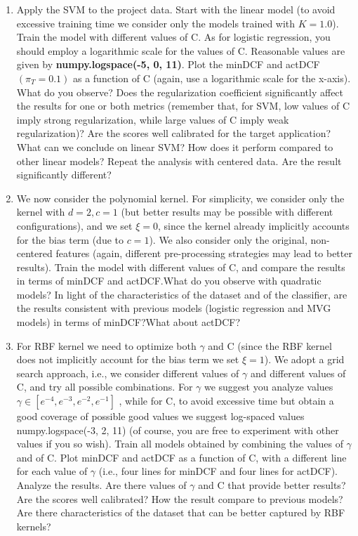 \documentclass[a4paper, 12pt, english]{article}
\begin{document}
    \begin{enumerate}
        \item Apply the SVM to the project data. Start with the linear model (to avoid excessive training time we consider only the models trained with \(K = 1.0\)). Train the model with different values of C. As for logistic regression, you should employ a logarithmic scale for the values of C. Reasonable values are given by \textbf{numpy.logspace(-5, 0, 11)}. Plot the minDCF and actDCF \((\pi_T = 0.1)\) as a function of C (again, use a logarithmic scale for the x-axis). What do you observe? Does the regularization coefficient significantly affect the results for one or both metrics (remember that, for SVM, low values of C imply strong regularization, while large values of C imply weak regularization)? Are the scores well calibrated for the target application? What can we conclude on linear SVM? How does it perform compared to other linear models? Repeat the analysis with centered data. Are the result significantly different?
        \item We now consider the polynomial kernel. For simplicity, we consider only the kernel with \(d = 2,c = 1\) (but better results may be possible with different configurations), and we set \(\xi = 0\), since the kernel already implicitly accounts for the bias term (due to \(c = 1\)). We also consider only the original, non-centered features (again, different pre-processing strategies may lead to better results). Train the model with different values of C, and compare the results in terms of minDCF and actDCF.\@ What do you observe with quadratic models? In light of the characteristics of the dataset and of the classifier, are the results consistent with previous models (logistic regression and MVG models) in terms of minDCF?\@ What about actDCF?\@
        \item For RBF kernel we need to optimize both \(\gamma\) and C (since the RBF kernel does not implicitly account for the bias term we set \(\xi = 1\)). We adopt a grid search approach, i.e., we consider different values of \(\gamma\) and different values of C, and try all possible combinations. For \(\gamma\) we suggest you analyze values \(\gamma \in [e^{-4},e^{-3},e^{-2},e^{-1}]\) , while for C, to avoid excessive time but obtain a good coverage of possible good values we suggest log-spaced values numpy.logspace(-3, 2, 11) (of course, you are free to experiment with other values if you so wish). Train all models obtained by combining the values of \(\gamma\) and of C. Plot minDCF and actDCF as a function of C, with a different line for each value of \(\gamma\) (i.e., four lines for minDCF and four lines for actDCF). Analyze the results. Are there values of \(\gamma\) and C that provide better results? Are the scores well calibrated? How the result compare to previous models? Are there characteristics of the dataset that can be better captured by RBF kernels?
    \end{enumerate}
\end{document}
